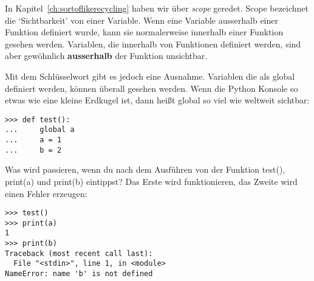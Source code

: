 In Kapitel~\ref{ch:sortoflikerecycling} haben wir über \emph{scope} geredet. Scope bezeichnet die `Sichtbarkeit' von einer Variable. Wenn eine Variable ausserhalb einer Funktion definiert wurde, kann sie normalerweise innerhalb einer Funktion gesehen werden. Variablen, die innerhalb von Funktionen definiert werden, sind aber gewöhnlich \textbf{ausserhalb} der Funktion unsichtbar.
\par
Mit dem  Schlüsselwort gibt es jedoch eine Ausnahme. Variablen die als global definiert werden, können überall gesehen werden. Wenn die Python Konsole so etwas wie eine kleine Erdkugel ist, dann heißt global so viel wie weltweit sichtbar:

\begin{Verbatim}[frame=single]
>>> def test():
...     global a
...     a = 1
...     b = 2
\end{Verbatim}

Was wird passieren, wenn du nach dem Ausführen von der Funktion test(), print(a) und print(b) eintippst? Das Erste wird funktionieren, das Zweite wird einen Fehler erzeugen:

\begin{Verbatim}[frame=single]
>>> test()
>>> print(a)
1
>>> print(b)
Traceback (most recent call last):
  File "<stdin>", line 1, in <module>
NameError: name 'b' is not defined
\end{Verbatim}

